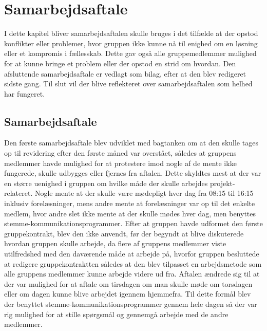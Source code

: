 \chapter{Samarbejdsaftale}\label{Samarbejdesaftale}
I dette kapitel bliver samarbejdsaftalen skulle bruges i det tilfælde at der opstod konflikter eller problemer, hvor gruppen ikke kunne nå til enighed om en løsning eller et kompromis i fællesskab. Dette gav også alle gruppemedlemmer mulighed for at kunne bringe et problem eller der opstod en strid om hvordan. Den afsluttende samarbejdsaftale er vedlagt som bilag, efter at den blev redigeret sidste gang. Til slut vil der blive reflekteret over samarbejdsaftalen som helhed har fungeret.

\section{Samarbejdsaftale}

Den første samarbejdsaftale blev udviklet med bagtanken om at den skulle tages op til revidering efter den første måned var overstået, således at gruppens medlemmer havde mulighed for at protestere imod nogle af de mente ikke fungerede, skulle udbygges eller fjernes fra aftalen. Dette skyldtes mest at der var en større uenighed i gruppen om hvilke måde der skulle arbejdes projekt-relateret. Nogle mente at der skulle være mødepligt hver dag fra 08:15 til 16:15 inklusiv forelæsninger, mens andre mente at forelæsninger var op til det enkelte medlem, hvor andre slet ikke mente at der skulle mødes hver dag, men benyttes stemme-kommunikationsprogrammer. 
Efter at gruppen havde udformet den første gruppekontrakt, blev den ikke anvendt, før der begyndt at blive diskuterede hvordan gruppen skulle arbejde, da flere af gruppens medlemmer viste utilfredshed med den daværende måde at arbejde på, hvorfor gruppen besluttede at redigere gruppekontraktten således at den blev tilpasset en arbejdsmetode som alle gruppens medlemmer kunne arbejde videre ud fra. Aftalen ændrede sig til at der var mulighed for at aftale om tirsdagen om man skulle møde om torsdagen eller om dagen kunne blive arbejdet igennem hjemmefra. Til dette formål blev der benyttet stemme-kommunikationsprogrammer gennem hele dagen så der var rig mulighed for at stille spørgsmål og gennemgå arbejde med de andre medlemmer.

